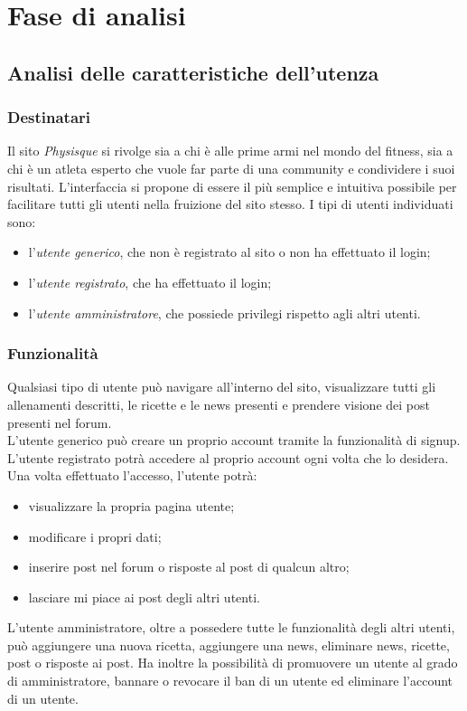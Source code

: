 \section{Fase di analisi}
\subsection{Analisi delle caratteristiche dell'utenza}
\label{sub:analisi_delle_caratteristiche_dell_utenza}
\subsubsection{Destinatari}
\label{subs:destinatari}
Il sito \emph{Physisque} si rivolge sia a chi è alle prime armi nel mondo del fitness, sia a chi è un atleta esperto che vuole far parte di una community e condividere i suoi risultati. 
L'interfaccia si propone di essere il più semplice e intuitiva possibile per facilitare tutti gli utenti nella fruizione del sito stesso. I tipi di utenti individuati sono:
\begin{itemize}
    \item l'\textit{utente generico}, che non è registrato al sito o non ha effettuato il login;
    \item l'\textit{utente registrato}, che ha effettuato il login;
    \item l'\textit{utente amministratore}, che possiede privilegi rispetto agli altri utenti.
\end{itemize}

\subsubsection{Funzionalità}
\label{subs:funzionalità}
Qualsiasi tipo di utente può navigare all'interno del sito, visualizzare tutti gli allenamenti descritti, le ricette e le news presenti e prendere visione dei post presenti nel forum.\\
L'utente generico può creare un proprio account tramite la funzionalità di signup. L'utente registrato potrà accedere al proprio account ogni volta che lo desidera. Una volta effettuato l'accesso, l'utente potrà:
\begin{itemize}
    \item visualizzare la propria pagina utente;
    \item modificare i propri dati;
    \item inserire post nel forum o risposte al post di qualcun altro;
    \item lasciare mi piace ai post degli altri utenti.
\end{itemize}
L'utente amministratore, oltre a possedere tutte le funzionalità degli altri utenti, 
può aggiungere una nuova ricetta, 
aggiungere una news, eliminare news, ricette, post o risposte ai post. Ha inoltre la possibilità di promuovere un utente al grado di amministratore, bannare o revocare il ban di un utente ed eliminare l'account di un utente.
